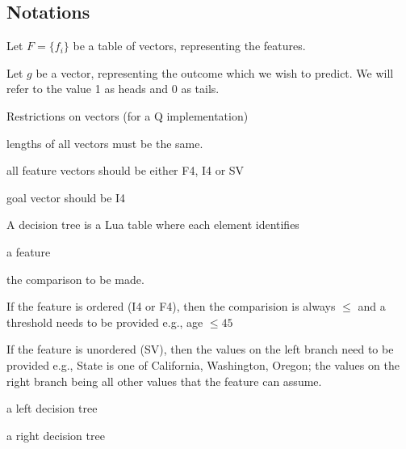 \subsection{Notations}

\bi
\item Let \(F = \{f_i\}\) be a table of vectors, representing the features.
\item Let \(g\) be a vector, representing the outcome which we wish to
predict. We will refer to the value 1 as heads and 0 as tails.
\item Restrictions on vectors (for a Q implementation)
\be
\item lengths of all vectors must be the same. 
\item all feature vectors should be either F4, I4 or SV
\item goal vector should be I4
\ee
\ei

A decision tree is a Lua table where each element identifies
\be
\item a feature
\item the comparison to be made. 
\be 
\item If the feature is ordered (I4 or F4), then the
comparision is always \(\leq\) and a threshold needs to be provided e.g., age
\(\leq 45\) 
\item If the feature is unordered (SV), then the values on the left branch need
to be provided e.g., State is one of California, Washington, Oregon; the values
on the right branch being all other values that the feature can assume.

\ee
\item a left decision tree
\item a right decision tree
\ee

